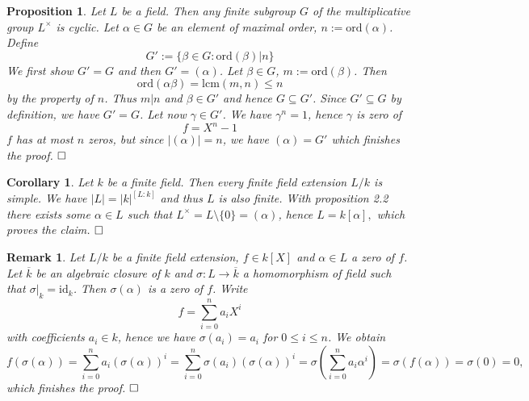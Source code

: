 \documentclass[11pt]{book}
\newtheorem{proposition}[theorem]{Proposition}
\newtheorem{corollary}[theorem]{Corollary}
\newtheorem{remark}[theorem]{Remark}
\theoremstyle{nonumberbreak}
\newenvironment{pr}[1][]{\ifthenelse{\equal{#1}{}}{\proof}{\proof[#1]}\rm}{\endproof}
\begin{document}
\begin{spacing}{1.3}
\begin{proposition} %
Let $L$ be a field. Then any finite subgroup $G$ of the multiplicative group $L^{\times}$ is cyclic.
\begin{pr}
Let $\alpha \in G$ be an element of maximal order, $n :=\textrm{ord}(\alpha)$. Define $$G':=\{\beta \in G: \textrm{ord}(\beta) \big \vert n \}$$
We first show $G'=G$ and then $G'=( \alpha )$.
Let $\beta \in G$, $m:= \textrm{ord}(\beta)$. Then $$\textrm{ord}(\alpha \beta)=\textrm{lcm}(m,n)\leqslant n$$by the property of $n$. Thus $m \big \vert n$ and $\beta \in G'$ and hence $G \subseteq G'$. Since $G' \subseteq G$ by definition, we have $G'=G$.
Let now $\gamma \in G'$. We have $\gamma^n=1$, hence $\gamma$ is zero of $$f= X^n-1$$$f$ has at most $n$ zeros, but since $\vert( \alpha )\vert=n$, we have $( \alpha ) = G'$ which finishes the proof. $\hfill \Box$
\end{pr}
\end{proposition}

\begin{corollary} %
Let $k$ be a finite field. Then every finite field extension $L/k$ is simple.
\begin{pr}
We have $|L|=|k|^{[L:k]}$ and thus $L$ is also finite. With proposition 2.2 there exists some $\alpha \in L$ such that
$L^{\times}=L \setminus \{0\}=( \alpha )$, hence $L=k[\alpha],$
which proves the claim. $\hfill \Box$
\end{pr}
\end{corollary}

\begin{remark} %
Let $L/k$ be a finite field extension, $f \in k[X]$ and $\alpha \in L$ a zero of $f$. Let $\overline{k}$ be an algebraic closure of $k$ and $\sigma: L \longrightarrow \overline{k}$ a homomorphism of field such that $\sigma|_{k}=\textrm{id}_{k}$.
Then $\sigma(\alpha)$ is a zero of $f$.
\begin{pr}
Write $$f=\sum_{i=0}^n a_i X^{i}$$ with coefficients $a_i \in k$, hence we have $\sigma(a_i)=a_i$ for $0\leqslant i \leqslant n$. We obtain
$$f\left(\sigma(\alpha)\right)=\sum_{i=0}^n a_i \left(\sigma(\alpha)\right)^{i}=\sum_{i=0}^n \sigma(a_i) \left(\sigma(\alpha)\right)^{i}=\sigma\left(\sum_{i=0}^n a_i \alpha^{i}\right)=\sigma\left(f(\alpha)\right)=\sigma(0)=0,$$
which finishes the proof. $\hfill \Box$
\end{pr}
\end{remark}


\end{spacing}
\end{document}
